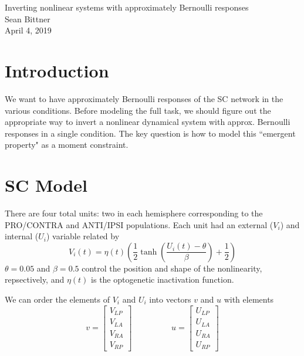 \documentclass[11pt]{article}
\begin{document}
\medskip                        %

\thispagestyle{plain}
\begin{center}                  %
{\Large Inverting nonlinear systems with approximately Bernoulli responses} \\
Sean Bittner \\
April 4, 2019 \\
\end{center}

\section{Introduction}
We want to have approximately Bernoulli responses of the SC network in the various conditions.  Before modeling the full task, we should figure out the appropriate way to invert a nonlinear dynamical system with approx. Bernoulli responses in a single condition.  The key question is how to model this ``emergent property" as a moment constraint.  

\section{SC Model}
There are four total units: two in each hemisphere corresponding to the PRO/CONTRA and ANTI/IPSI populations.  Each unit had an external ($V_i$) and internal ($U_i$) variable related by
\begin{equation}
V_i(t) =\eta(t)\left(\frac{1}{2}\tanh\left(\frac{U_i(t) - \theta}{\beta}\right)+ \frac{1}{2} \right)
\end{equation}
$\theta = 0.05$ and $\beta = 0.5$ control the position and shape of the nonlinearity, repsectively, and $\eta(t)$ is the optogenetic inactivation function.

We can order the elements of $V_i$ and $U_i$ into vectors $v$ and $u$ with elements
\begin{equation}
v = \begin{bmatrix} V_{LP} \\ V_{LA} \\ V_{RA} \\ V_{RP} \end{bmatrix} \hspace{2cm} u = \begin{bmatrix} U_{LP} \\ U_{LA} \\ U_{RA} \\ U_{RP} \end{bmatrix}
\end{equation}
\end{document}
